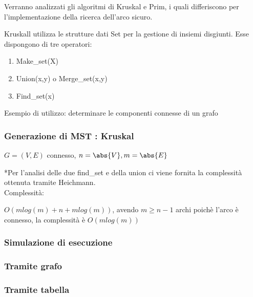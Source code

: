 \documentclass[11pt,a4paper,twoside,openright]{book}
\providecommand{\tightlist}{\setlength{\itemsep}{0pt}\setlength{\parskip}{0pt}}
\begin{document}
{{

{Verranno analizzati gli algoritmi di Kruskal e Prim, i quali differiscono per l'implementazione della ricerca dell'arco sicuro.}

{Kruskall utilizza le strutture dati Set per la gestione di insiemi disgiunti. Esse dispongono di tre operatori:}

\begin{enumerate}
\tightlist
\item
  {Make\_set(X)}
\item
  {Union(x,y) o Merge\_set(x,y)}
\item
  {Find\_set(x)}
\end{enumerate}

{Esempio di utilizzo: determinare le componenti connesse di un grafo}



\subsubsection{Generazione di MST : Kruskal}

$G=(V,E)$ connesso, $n=\abs{V},m=\abs{E}$



{*Per l'analisi delle due find\_set e della union ci viene fornita la complessità ottenuta tramite Heichmann.\\
}{Complessità}{:}

{$O(mlog(m)+n+mlog(m))$, avendo $m \geq n-1$ archi poichè l'arco è connesso, la complessità è $O(mlog(m))$}

\subsubsection{Simulazione di esecuzione}

\subsubsection{Tramite grafo}



\subsubsection{Tramite tabella}

}}
\end{document}
